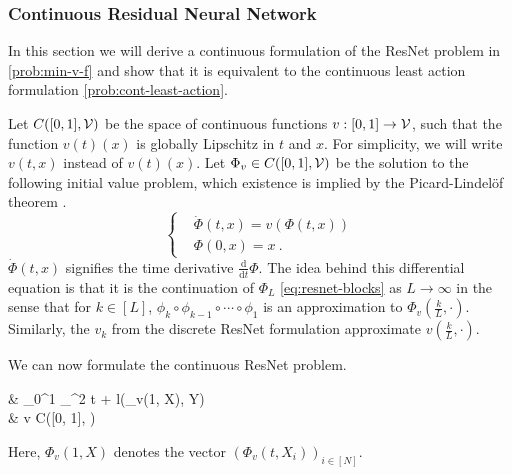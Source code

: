 \subsubsection{Continuous Residual Neural Network} 
In this section we will derive a continuous formulation of the ResNet problem in \ref{prob:min-v-f} and show that it is equivalent to the continuous least action formulation \ref{prob:cont-least-action}.

Let $C([0, 1], \mathcal{V})$ be the space of continuous functions $v: [0, 1] \rightarrow \mathcal{V}$, such that the function $v(t)(x)$ is globally Lipschitz in $t$ and $x$.
For simplicity, we will write $v(t, x)$ instead of $v(t)(x)$.
Let $\Phi_v \in C([0, 1], \mathcal{V})$ be the solution to the following initial value problem, which existence is implied by the Picard-Lindelöf theorem \cite[Theorem 1.2.3]{arino06}.
\begin{equation}
	\label{eq:phi-v-differential-equation}
	\begin{cases}
		&\dot{\Phi}(t, x) = v(\Phi(t, x))\\
		&\Phi(0, x) = x \ .
	\end{cases}
\end{equation}
$\dot{\Phi}(t, x)$ signifies the time derivative $\frac{\mathrm{d}}{\mathrm{d}t}\Phi$.
The idea behind this differential equation is that it is the continuation of $\Phi_L$ \ref{eq:resnet-blocks} as $L \rightarrow \infty$  in the sense that for $k \in [L]$, $\phi_k \circ \phi_{k-1} \circ \cdots \circ \phi_1$ is an approximation to $\Phi_v(\frac{k}{L}, \cdot)$.
Similarly, the $v_k$ from the discrete ResNet formulation approximate $v(\frac{k}{L}, \cdot)$.

We can now formulate the continuous ResNet problem.
\begin{problem}
	\label{prob:resnet-limit}
	\begin{cases}
		&  \int_{0}^{1} _\cV^2 t
		+ l(\Phi_v(1, X), Y)\\
		& v \in C([0, 1], \cV)\\
	\end{cases}
\end{problem}
Here, $\Phi_v(1, X)$ denotes the vector $(\Phi_v(t, X_i))_{i \in [N]}$.

